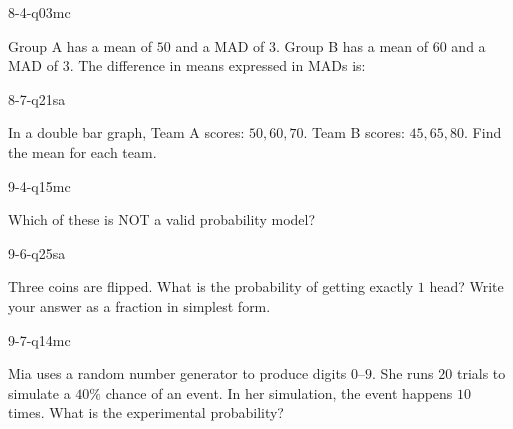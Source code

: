 \begin{practiceQuestion}{8-4-q03}{mc}
\begin{questionText}
Group A has a mean of $50$ and a MAD of $3$. Group B has a mean of $60$ and a MAD of $3$. The difference in means expressed in MADs is:
\end{questionText}
\end{practiceQuestion}

\begin{practiceQuestion}{8-7-q21}{sa}
\begin{questionText}
In a double bar graph, Team A scores: $50, 60, 70$. Team B scores: $45, 65, 80$. Find the mean for each team.
\end{questionText}
\end{practiceQuestion}

\begin{practiceQuestion}{9-4-q15}{mc}
\begin{questionText}
Which of these is NOT a valid probability model?
\end{questionText}
\end{practiceQuestion}

\begin{practiceQuestion}{9-6-q25}{sa}
\begin{questionText}
Three coins are flipped. What is the probability of getting exactly $1$ head? Write your answer as a fraction in simplest form.
\end{questionText}
\end{practiceQuestion}

\begin{practiceQuestion}{9-7-q14}{mc}
\begin{questionText}
Mia uses a random number generator to produce digits $0$--$9$. She runs $20$ trials to simulate a $40\%$ chance of an event. In her simulation, the event happens $10$ times. What is the experimental probability?
\end{questionText}
\end{practiceQuestion}
